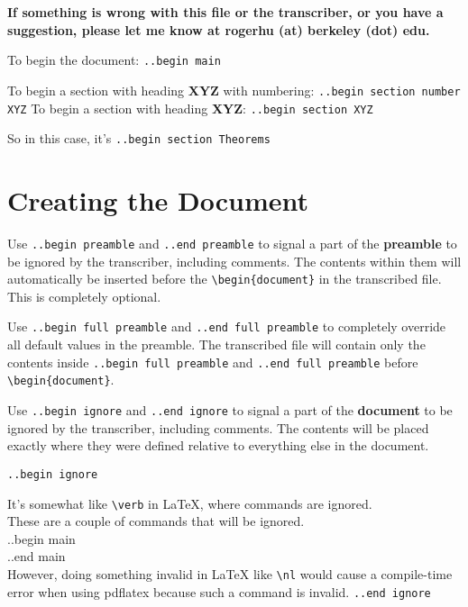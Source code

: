 \documentclass[12pt]{article}
\begin{document}
\begin{flushleft}

\textbf{If something is wrong with this file or the transcriber, or you have a suggestion, please let me know at rogerhu (at) berkeley (dot) edu.}

\bigskip

To begin the document: \verb|..begin main|

\bigskip

To begin a section with heading \textbf{XYZ} with numbering: \verb|..begin section number XYZ|
To begin a section with heading \textbf{XYZ}: \verb|..begin section XYZ|

So in this case, it's \verb|..begin section Theorems|

\section*{Creating the Document}

Use \verb|..begin preamble| and \verb|..end preamble| to signal a part of the \textbf{preamble} to be ignored by the transcriber, including comments. The contents within them will automatically be inserted before the \verb|\begin{document}| in the transcribed file. This is completely optional.

\bigskip

Use \verb|..begin full preamble| and \verb|..end full preamble| to completely override all default values in the preamble. The transcribed file will contain only the contents inside \verb|..begin full preamble| and \verb|..end full preamble| before \verb|\begin{document}|.

\bigskip

Use \verb|..begin ignore| and \verb|..end ignore| to signal a part of the \textbf{document} to be ignored by the transcriber, including comments. The contents will be placed exactly where they were defined relative to everything else in the document.

\verb|..begin ignore|

It's somewhat like \verb|\verb| in LaTeX, where commands are ignored. \\
These are a couple of commands that will be ignored. \\
..begin main \\
..end main \\
However, doing something invalid in LaTeX like \verb|\nl| would cause a compile-time error when using pdflatex because such a command is invalid. 
\verb|..end ignore|



\end{flushleft}
\end{document}
